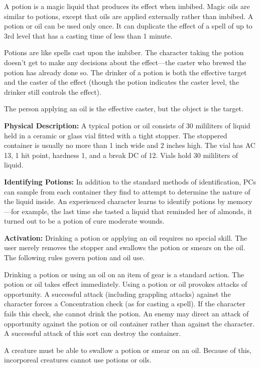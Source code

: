 A potion is a magic liquid that produces its effect when imbibed. Magic oils are similar to potions, except that oils are applied externally rather than imbibed. A potion or oil can be used only once. It can duplicate the effect of a spell of up to 3rd level that has a casting time of less than 1 minute.

Potions are like spells cast upon the imbiber. The character taking the potion doesn't get to make any decisions about the effect---the caster who brewed the potion has already done so. The drinker of a potion is both the effective target and the caster of the effect (though the potion indicates the caster level, the drinker still controls the effect).

The person applying an oil is the effective caster, but the object is the target.

\textbf{Physical Description:} A typical potion or oil consists of 30 mililiters of liquid held in a ceramic or glass vial fitted with a tight stopper. The stoppered container is usually no more than 1 inch wide and 2 inches high. The vial has AC 13, 1 hit point, hardness 1, and a break DC of 12. Vials hold 30 mililiters of liquid.

\textbf{Identifying Potions:} In addition to the standard methods of identification, PCs can sample from each container they find to attempt to determine the nature of the liquid inside. An experienced character learns to identify potions by memory---for example, the last time she tasted a liquid that reminded her of almonds, it turned out to be a potion of cure moderate wounds.

\textbf{Activation:} Drinking a potion or applying an oil requires no special skill. The user merely removes the stopper and swallows the potion or smears on the oil. The following rules govern potion and oil use.

Drinking a potion or using an oil on an item of gear is a standard action. The potion or oil takes effect immediately. Using a potion or oil provokes attacks of opportunity. A successful attack (including grappling attacks) against the character forces a Concentration check (as for casting a spell). If the character fails this check, she cannot drink the potion. An enemy may direct an attack of opportunity against the potion or oil container rather than against the character. A successful attack of this sort can destroy the container.

A creature must be able to swallow a potion or smear on an oil. Because of this, incorporeal creatures cannot use potions or oils.

